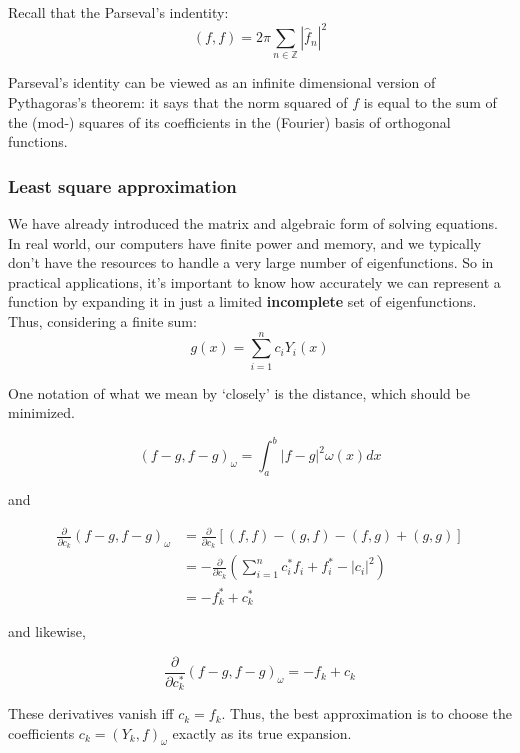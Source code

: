 \documentclass{article}
\theoremstyle{definition}
\begin{document}
Recall that the Parseval's indentity:
\begin{equation}
(f,f)=2\pi \sum_{n\in \mathbb{Z}} |\hat{f}_n|^2
\end{equation}


Parseval's identity can be viewed as an infinite dimensional version of Pythagoras's theorem: it says that the norm squared of $f$ is equal to the sum of the (mod-) squares of its coefficients in the (Fourier) basis of orthogonal functions.

\subsubsection{Least square approximation}

We have already introduced the matrix and algebraic form of solving equations. In real world, our computers have finite power and memory, and we typically don't have the resources to handle a very large number of eigenfunctions. So in practical applications, it's important to know how accurately we can represent a function by expanding it in just a limited \textbf{incomplete} set of eigenfunctions. Thus, considering a finite sum:
\begin{equation}
g(x)=\sum_{i=1}^{n} c_i Y_i(x)
\end{equation}

One notation of what we mean by `closely' is the distance, which should be minimized.

\begin{equation}
(f-g,f-g)_\omega=\int_a^b |f-g|^2\omega(x)dx
\end{equation}


and 

\begin{align}
\frac{\partial}{\partial c_k}(f-g,f-g)_\omega&=\frac{\partial}{\partial c_k}[(f,f)-(g,f)-(f,g)+(g,g)]\\
											 &= -\frac{\partial}{\partial c_k}(\sum_{i=1}^nc_i^*f_i+f_i^*-|c_i|^2)\\
											 &=-f^*_k+c_k^*
\end{align}


and likewise,

\begin{equation}
\frac{\partial}{\partial c_k^*}(f-g,f-g)_\omega=-f_k+c_k
\end{equation}


These derivatives vanish iff $c_k=f_k$. Thus, the best approximation is to choose the coefficients $c_k=(Y_k,f)_\omega$ exactly as its true expansion.
\end{document}
